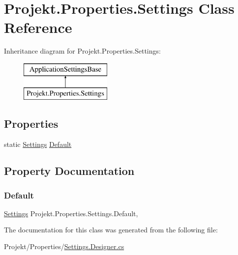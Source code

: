 \hypertarget{class_projekt_1_1_properties_1_1_settings}{}\section{Projekt.\+Properties.\+Settings Class Reference}
\label{class_projekt_1_1_properties_1_1_settings}
Inheritance diagram for Projekt.\+Properties.\+Settings\+:\begin{figure}[H]
\begin{center}
\leavevmode
\includegraphics[height=2.000000cm]{class_projekt_1_1_properties_1_1_settings}
\end{center}
\end{figure}
\subsection*{Properties}
\begin{DoxyCompactItemize}
\item 
static \mbox{\hyperlink{class_projekt_1_1_properties_1_1_settings}{Settings}} \mbox{\hyperlink{class_projekt_1_1_properties_1_1_settings_ae85c7fed42e6abe779d82a49438ccd9a}{Default}}
\end{DoxyCompactItemize}


\subsection{Property Documentation}
\mbox{\label{class_projekt_1_1_properties_1_1_settings_ae85c7fed42e6abe779d82a49438ccd9a}} 
\subsubsection{\texorpdfstring{Default}{Default}}
{\footnotesize\ttfamily \mbox{\hyperlink{class_projekt_1_1_properties_1_1_settings}{Settings}} Projekt.\+Properties.\+Settings.\+Default\hspace{0.3cm}{\ttfamily [static]}, {\ttfamily [get]}}



The documentation for this class was generated from the following file\+:\begin{DoxyCompactItemize}
\item 
Projekt/\+Properties/\mbox{\hyperlink{_settings_8_designer_8cs}{Settings.\+Designer.\+cs}}\end{DoxyCompactItemize}
